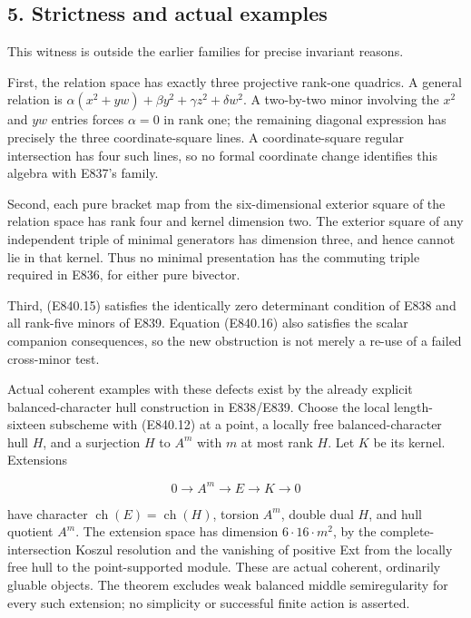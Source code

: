 \subsection{5. Strictness and actual
examples}\label{SF-E840:strictness-and-actual-examples}

This witness is outside the earlier families for precise invariant
reasons.

First, the relation space has exactly three projective rank-one
quadrics. A general relation is
\(\alpha(x^2+yw)+\beta y^2+\gamma z^2+\delta w^2\). A two-by-two minor
involving the \(x^2\) and \(yw\) entries forces \(\alpha=0\) in rank
one; the remaining diagonal expression has precisely the three
coordinate-square lines. A coordinate-square regular intersection has
four such lines, so no formal coordinate change identifies this algebra
with E837's family.

Second, each pure bracket map from the six-dimensional exterior square
of the relation space has rank four and kernel dimension two. The
exterior square of any independent triple of minimal generators has
dimension three, and hence cannot lie in that kernel. Thus no minimal
presentation has the commuting triple required in E836, for either pure
bivector.

Third, (E840.15) satisfies the identically zero determinant condition of
E838 and all rank-five minors of E839. Equation (E840.16) also satisfies
the scalar companion consequences, so the new obstruction is not merely
a re-use of a failed cross-minor test.

Actual coherent examples with these defects exist by the already
explicit balanced-character hull construction in E838/E839. Choose the
local length-sixteen subscheme with (E840.12) at a point, a locally free
balanced-character hull \(H\), and a surjection \(H\) to \(A^m\) with
\(m\) at most rank \(H\). Let \(K\) be its kernel. Extensions

\[
                      0\longrightarrow A^m
                      \longrightarrow E\longrightarrow K
                      \longrightarrow0
 \tag{E840.18}
\]

have character \(\operatorname{ch}(E)=\operatorname{ch}(H)\), torsion
\(A^m\), double dual \(H\), and hull quotient \(A^m\). The extension
space has dimension \(6\cdot16\cdot m^2\), by the complete-intersection
Koszul resolution and the vanishing of positive Ext from the locally
free hull to the point-supported module. These are actual coherent,
ordinarily gluable objects. The theorem excludes weak balanced middle
semiregularity for every such extension; no simplicity or successful
finite action is asserted.

